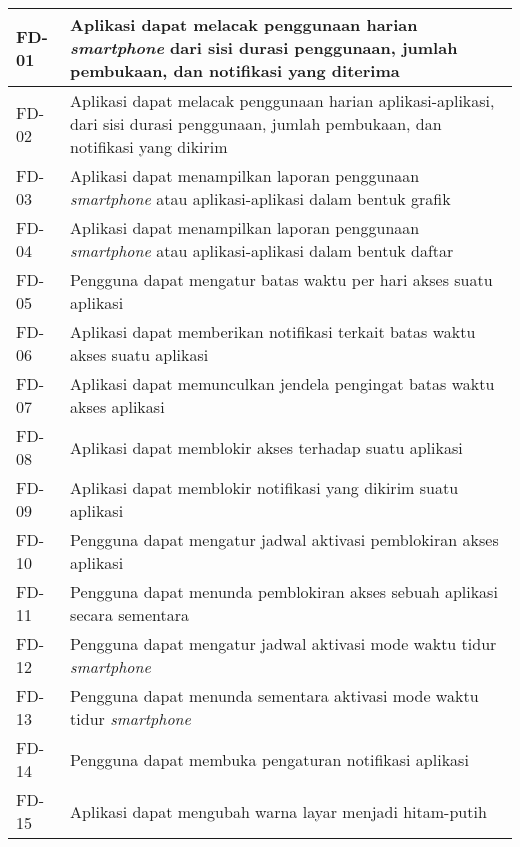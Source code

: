 \begin{small}
\begin{longtable}[c]{|W{c}{0.08\textwidth}|>{\ccnormspacing}m{0.82\textwidth}|}
  FD-01  &  Aplikasi dapat melacak penggunaan harian \textit{smartphone} dari sisi durasi penggunaan, jumlah pembukaan, dan notifikasi yang diterima \\ \hline
  FD-02  &  Aplikasi dapat melacak penggunaan harian aplikasi-aplikasi, dari sisi durasi penggunaan, jumlah pembukaan, dan notifikasi yang dikirim \\ \hline
  FD-03  &  Aplikasi dapat menampilkan laporan penggunaan \textit{smartphone} atau aplikasi-aplikasi dalam bentuk grafik \\ \hline
  FD-04  &  Aplikasi dapat menampilkan laporan penggunaan \textit{smartphone} atau aplikasi-aplikasi dalam bentuk daftar \\ \hline
  FD-05  &  Pengguna dapat mengatur batas waktu per hari akses suatu aplikasi \\ \hline
  FD-06  &  Aplikasi dapat memberikan notifikasi terkait batas waktu akses suatu aplikasi \\ \hline
  FD-07  &  Aplikasi dapat memunculkan jendela pengingat batas waktu akses aplikasi \\ \hline
  FD-08  &  Aplikasi dapat memblokir akses terhadap suatu aplikasi \\ \hline
  FD-09  &  Aplikasi dapat memblokir notifikasi yang dikirim suatu aplikasi \\ \hline
  FD-10  &  Pengguna dapat mengatur jadwal aktivasi pemblokiran akses aplikasi \\ \hline
  FD-11  &  Pengguna dapat menunda pemblokiran akses sebuah aplikasi secara sementara \\ \hline
  FD-12  &  Pengguna dapat mengatur jadwal aktivasi mode waktu tidur \textit{smartphone} \\ \hline
  FD-13  &  Pengguna dapat menunda sementara aktivasi mode waktu tidur \textit{smartphone} \\ \hline
  FD-14  &  Pengguna dapat membuka pengaturan notifikasi aplikasi \\ \hline
  FD-15  &  Aplikasi dapat mengubah warna layar menjadi hitam-putih \\ \hline
\end{longtable}
\end{small}
\justifying
\FloatBarrier

